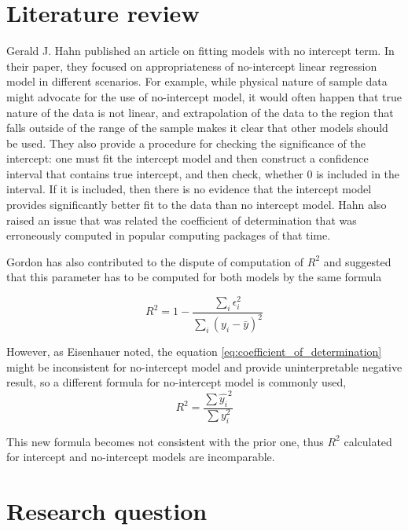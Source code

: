 \documentclass[12pt,a4paper,oneside]{book} %
\begin{document}
	\section{Literature review}

	Gerald J. Hahn \cite{hahn1977fitting} published an article on fitting models with no intercept term. In their paper, they focused on appropriateness of no-intercept linear regression model in different scenarios. For example, while physical nature of sample data might advocate for the use of no-intercept model, it would often happen that true nature of the data is not linear, and extrapolation of the data to the region that falls outside of the range of the sample makes it clear that other models should be used. They also provide a procedure for checking the significance of the intercept: one must fit the intercept model and then construct a confidence interval that contains true intercept, and then check, whether 0 is included in the interval. If it is included, then there is no evidence that the intercept model provides significantly better fit to the data than no intercept model. Hahn also raised an issue that was related the coefficient of determination that was erroneously computed in popular computing packages of that time.
	
	Gordon \cite{gordon1981errors} has also contributed to the dispute of computation of $R^2$ and suggested that this parameter has to be computed for both models by the same formula 
	
	\begin{equation} \label{eq:coefficient_of_determination}
		R^2 = 1 - \frac{\sum_i \epsilon_i ^2}{\sum_i (y_i-\bar{y})^2}
	\end{equation}

	
	However, as Eisenhauer \cite{eisenhauer2003regression} noted, the equation \ref{eq:coefficient_of_determination} might be inconsistent for no-intercept model and provide uninterpretable negative result, so a different formula for no-intercept model is commonly used, 
	\begin{equation}
		R^2 = \frac{\sum \hat{y_i}^2}{\sum y_i^2}
	\end{equation}
	
	This new formula becomes not consistent with the prior one, thus  $R^2$ calculated for intercept and no-intercept models are incomparable. 
	
	
	
	\section{Research question}
	
\end{document}
